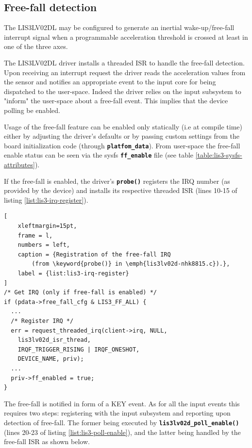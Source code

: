 \documentclass[a4paper,10pt]{article}
\newcommand{\keyword}[1]{\texttt{\textbf{#1}}}
\begin{document}
\begin{multicols}{2}
\subsection{Free-fall detection}
\label{sec:lis3_poll}
The LIS3LV02DL may be configured to generate an inertial wake-up/free-fall
interrupt signal when a programmable acceleration threshold is crossed at least
in one of the three axes.

The LIS3LV02DL driver installs a threaded ISR to handle the free-fall detection.
Upon receiving an interrupt request the driver reads the acceleration values
from the sensor and notifies an appropriate event to the input core for being
dispatched to the user-space.
Indeed the driver relies on the input subsystem to "inform" the user-space
about a free-fall event. This implies that the device polling be enabled.

Usage of the free-fall feature can be enabled only statically (i.e at compile
time) either by adjusting the driver's defaults or by passing custom settings
from the board initialization code (through \keyword{platfom\_data}).
From user-space the free-fall enable status can be seen via the sysfs
\keyword{ff\_enable} file (see table \ref{table:lis3-sysfs-attributes}).

If the free-fall is enabled, the driver's \keyword{probe()} registers the IRQ
number (as provided by the device) and installs its respective threaded ISR
(lines 10-15 of listing \ref{list:lis3-irq-register}).

\begin{lstlisting}[
	xleftmargin=15pt,
	frame = l,
	numbers = left,
	caption = {Registration of the free-fall IRQ
		(from \keyword{probe()} in \emph{lis3lv02d-nhk8815.c}).},
	label = {list:lis3-irq-register}
]
/* Get IRQ (only if free-fall is enabled) */
if (pdata->free_fall_cfg & LIS3_FF_ALL) {
  ...
  /* Register IRQ */
  err = request_threaded_irq(client->irq, NULL,
    lis3lv02d_isr_thread,
    IRQF_TRIGGER_RISING | IRQF_ONESHOT,
    DEVICE_NAME, priv);
  ...
  priv->ff_enabled = true;
}
\end{lstlisting}

The free-fall is notified in form of a KEY event. As for all the input
events this requires two steps: registering with the input subsystem
and reporting upon detection of free-fall.
The former being executed by \keyword{lis3lv02d\_poll\_enable()} (lines 20-23
of listing \ref{list:lis3-poll-enable}), and the latter being handled by the
free-fall ISR as shown below.


\end{multicols}
\end{document}

